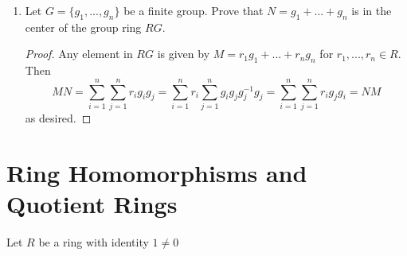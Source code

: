 \documentclass{report}
\begin{document}
\begin{enumerate}
    
    \item Let $G=\{g_1,...,g_n\}$ be a finite group. Prove that $N=g_1+...+g_n$ is in the center of the group ring $RG$.
    \begin{proof}
        Any element in $RG$ is given by $M=r_1g_1+...+r_ng_n$ for $r_1,...,r_n\in R$. Then
        $$MN = \sum_{i=1}^n\sum_{j=1}^n r_ig_ig_j =\sum_{i=1}^n r_i\sum_{j=1}^n g_ig_jg_j^{-1}g_j=\sum_{i=1}^n \sum_{j=1}^n r_ig_jg_i = NM$$
        as desired.
    \end{proof}
\end{enumerate}

\section{Ring Homomorphisms and Quotient Rings}
Let $R$ be a ring with identity $1\neq 0$
\end{document}
